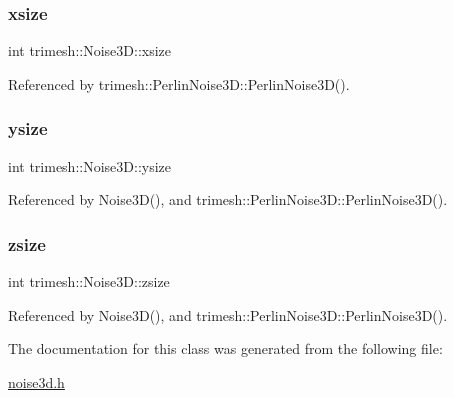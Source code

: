 \mbox{\label{classtrimesh_1_1Noise3D_ac341c7ec5a42933deecb9d0b7e87d8b5}} 
\subsubsection{\texorpdfstring{xsize}{xsize}}
{\footnotesize\ttfamily int trimesh\+::\+Noise3\+D\+::xsize}



Referenced by trimesh\+::\+Perlin\+Noise3\+D\+::\+Perlin\+Noise3\+D().

\mbox{\label{classtrimesh_1_1Noise3D_ab3f074a621d845415b630b2557b2abe8}} 
\subsubsection{\texorpdfstring{ysize}{ysize}}
{\footnotesize\ttfamily int trimesh\+::\+Noise3\+D\+::ysize}



Referenced by Noise3\+D(), and trimesh\+::\+Perlin\+Noise3\+D\+::\+Perlin\+Noise3\+D().

\mbox{\label{classtrimesh_1_1Noise3D_a4086f2c7e2bca05060da451dfea9ac89}} 
\subsubsection{\texorpdfstring{zsize}{zsize}}
{\footnotesize\ttfamily int trimesh\+::\+Noise3\+D\+::zsize}



Referenced by Noise3\+D(), and trimesh\+::\+Perlin\+Noise3\+D\+::\+Perlin\+Noise3\+D().



The documentation for this class was generated from the following file\+:\begin{DoxyCompactItemize}
\item 
\hyperlink{noise3d_8h}{noise3d.\+h}\end{DoxyCompactItemize}
